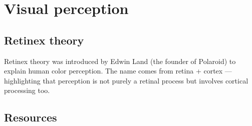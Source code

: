 \chapter{Visual perception}

\section{Retinex theory}

Retinex theory was introduced by Edwin Land (the founder of Polaroid)
to explain human color perception. The name comes from retina + cortex
— highlighting that perception is not purely a retinal process but
involves cortical processing too.


\section{Resources}


